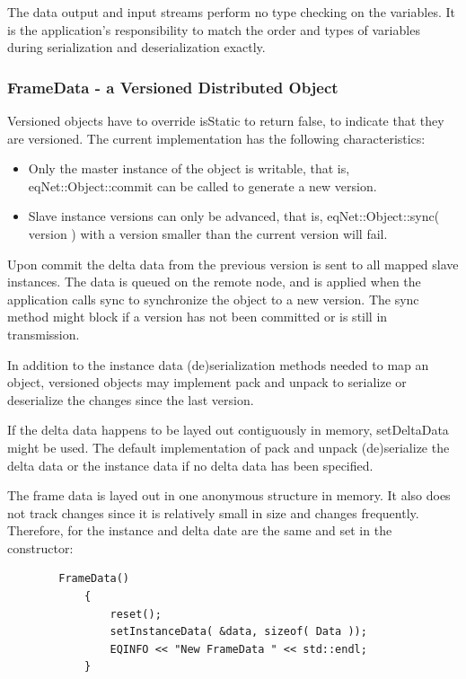 \documentclass[10pt,a4]{scrartcl}
\begin{document}
The data output and input streams perform no type checking on the
variables. It is the application's responsibility to match the order and
types of variables during serialization and deserialization exactly.

\subsubsection{FrameData - a Versioned Distributed Object}

Versioned objects have to override \textsf{isStatic} to return false, to
indicate that they are versioned. The current implementation has the
following characteristics:
\begin{itemize}
\item Only the master instance of the object is writable, that is,
  \textsf{eqNet::Object::com\-mit} can be called to generate a new
  version.
\item Slave instance versions can only be advanced, that is,
  \textsf{eqNet::Object::sync( version )} with a version smaller than
  the current version will fail.
\end{itemize}

Upon \textsf{commit} the delta data from the previous version is sent to
all mapped slave instances. The data is queued on the remote node, and
is applied when the application calls \textsf{sync} to synchronize the
object to a new version. The \textsf{sync} method might block if a
version has not been committed or is still in transmission.

In addition to the instance data (de)serialization methods needed to map
an object, versioned objects may implement \textsf{pack} and
\textsf{unpack} to serialize or deserialize the changes since the last
version.

If the delta data happens to be layed out contiguously in memory,
\textsf{setDeltaData} might be used. The default implementation of
\textsf{pack} and \textsf{unpack} (de)serialize the delta data or the
instance data if no delta data has been specified.

The frame data is layed out in one anonymous structure in
memory. It also does not track changes since it is relatively small in
size and changes frequently. Therefore, for the instance and delta
date are the same and set in the constructor:

{\footnotesize\begin{lstlisting}
        FrameData()
            {
                reset();
                setInstanceData( &data, sizeof( Data ));
                EQINFO << "New FrameData " << std::endl;
            }
\end{lstlisting}}%
\end{document}
